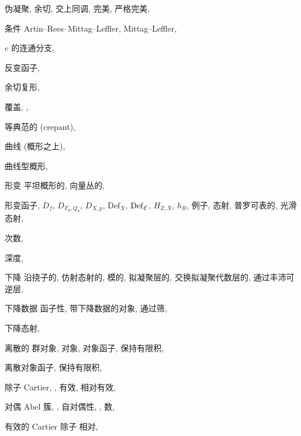 \begin{theindex}
\subitem 伪凝聚, 
\subitem 余切, 
\subitem 交上同调, 
\subitem 完美, 
\subitem 严格完美, 
\item 条件
\subitem Artin--Rees--Mittag--Leffler, 
\subitem Mittag--Leffler, 
\item $e$ 的连通分支, 
\item 反变函子, 
\item 余切复形, 
\item 覆盖, , 
\item 等典范的 (crepant), 
\item 曲线 (概形之上), 
\item 曲线型概形, 
\indexspace
\item 形变
\subitem 平坦概形的, 
\subitem 向量丛的, 
\item 形变函子, 
\subitem $D_f$, 
\subitem $D_{F_0,Q_0}$, 
\subitem $D_{X,p}$, 
\subitem $\mathrm{Def}_X$, 
\subitem $\mathrm{Def}_{\mathcal E}$, 
\subitem $H_{Z,X}$, 
\subitem $h_R$, 
\subitem 例子, 
\subitem 态射, 
\subitem 普罗可表的, 
\subitem 光滑态射, 
\item 次数, 
\item 深度, 
\item 下降
\subitem 沿挠子的, 
\subitem 仿射态射的, 
\subitem 模的, 
\subitem 拟凝聚层的, 
\subitem 交换拟凝聚代数层的, 
\subitem 通过丰沛可逆层, 
\item 下降数据
\subitem 函子性, 
\subitem 带下降数据的对象, 
\subitem 通过筛, 
\item 下降态射, 
\item 离散的
\subitem 群对象, 
\subitem 对象, 
\subitem 对象函子, 
\subsubitem 保持有限积, 
\item 离散对象函子, 
\subitem 保持有限积, 
\item 除子
\subitem Cartier, , 
\subitem 有效, 
\subsubitem 相对有效, 
\item 对偶
\subitem Abel 簇, , 
\subitem 自对偶性, , 
\subitem 数, 
\indexspace
\item 有效的
\subitem Cartier 除子
\subsubitem 相对, 


\end{theindex}
